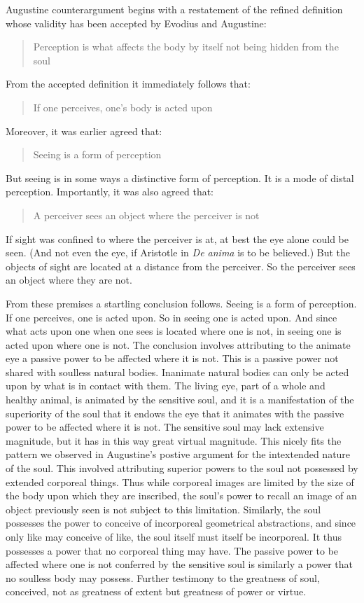 \documentclass[12pt]{article}
\begin{document}
Augustine counterargument begins with a restatement of the refined definition whose validity has been accepted by Evodius and Augustine:
\begin{quote}
	Perception is what affects the body by itself not being hidden from the soul
\end{quote}
From the accepted definition it immediately follows that:
\begin{quote}
	If one perceives, one's body is acted upon
\end{quote}
Moreover, it was earlier agreed that:
\begin{quote}
	Seeing is a form of perception
\end{quote}
But seeing is in some ways a distinctive form of perception. It is a mode of distal perception. Importantly, it was also agreed that:
\begin{quote}
	A perceiver sees an object where the perceiver is not
\end{quote}
If sight was confined to where the perceiver is at, at best the eye alone could be seen. (And not even the eye, if Aristotle in \emph{De anima} is to be believed.) But the objects of sight are located at a distance from the perceiver. So the perceiver sees an object where they are not. 

From these premises a startling conclusion follows. Seeing is a form of perception. If one perceives, one is acted upon. So in seeing one is acted upon. And since what acts upon one when one sees is located where one is not, in seeing one is acted upon where one is not. The conclusion involves attributing to the animate eye a passive power to be affected where it is not. This is a passive power not shared with soulless natural bodies. Inanimate natural bodies can only be acted upon by what is in contact with them. The living eye, part of a whole and healthy animal, is animated by the sensitive soul, and it is a manifestation of the superiority of the soul that it endows the eye that it animates with the passive power to be affected where it is not. The sensitive soul may lack extensive magnitude, but it has in this way great virtual magnitude. This nicely fits the pattern we observed in Augustine's postive argument for the intextended nature of the soul. This involved attributing superior powers to the soul not possessed by extended corporeal things. Thus while corporeal images are limited by the size of the body upon which they are inscribed, the soul's power to recall an image of an object previously seen is not subject to this limitation. Similarly, the soul possesses the power to conceive of incorporeal geometrical abstractions, and since only like may conceive of like, the soul itself must itself be incorporeal. It thus possesses a power that no corporeal thing may have. The passive power to be affected where one is not conferred by the sensitive soul is similarly a power that no soulless body may possess. Further testimony to the greatness of soul, conceived, not as greatness of extent but greatness of power or virtue.
\end{document}
